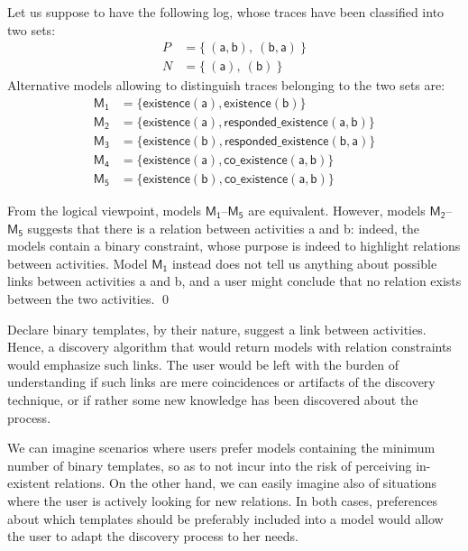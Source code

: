 \begin{example}
\label{ex:unaryVsBinary}
Let us suppose to have the following log, whose traces have been classified into two sets:
%
\begin{align*}
P & = \{\ (\mathsf{a}, \mathsf{b}),\ (\mathsf{b}, \mathsf{a})\ \} \\
N & = \{\ (\mathsf{a}),\ (\mathsf{b})\ \}
\end{align*}
%
Alternative models allowing to distinguish traces belonging to the two sets are:
\begin{align*}
\mathsf{M_1} & = \{ \mathsf{existence(a),existence(b)}\} \\
\mathsf{M_2} & = \{ \mathsf{existence(a), responded\_existence(a, b)}\} \\
\mathsf{M_3} & = \{ \mathsf{existence(b), responded\_existence(b, a)}\} \\
\mathsf{M_4} & = \{ \mathsf{existence(a), co\_existence(a, b)}\} \\
\mathsf{M_5} & = \{ \mathsf{existence(b), co\_existence(a, b)}\}
\end{align*}
%

From the logical viewpoint, models $\mathsf{M_1}$--$\mathsf{M_5}$ are equivalent. However, models $\mathsf{M_2}$--$\mathsf{M_5}$ suggests that there is a relation between activities \textsf{a} and \textsf{b}: indeed, the models contain a binary constraint, whose purpose is indeed to highlight relations between activities. Model $\mathsf{M_1}$  instead does not tell us anything about possible links between activities \textsf{a} and \textsf{b}, and a user might conclude that no relation exists between the two activities.
\qed
\end{example}

Declare binary templates, by their nature, suggest a link between activities. Hence, a discovery algorithm that would return models with relation constraints would emphasize such links. The user would be left with the burden of understanding if such links are mere coincidences or artifacts of the discovery technique, or if rather some new knowledge has been discovered about the process.

We can imagine scenarios where users prefer models containing the minimum number of binary templates, so as to not incur into the risk of perceiving in-existent relations. On the other hand, we can easily imagine also of situations where the user is actively looking for new relations. In both cases, preferences about which templates should be preferably included into a model would allow the user to adapt the discovery process to her needs.

